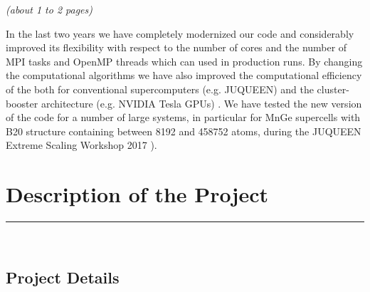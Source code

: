 \documentclass [a4paper, 12pt]{article}
\begin{document}
\textit{(about 1 to 2 pages)}


In the last two years we have completely modernized our code and considerably improved 
its flexibility with respect to the number of cores and the number of MPI tasks and
OpenMP threads which can used in production runs. By changing the computational algorithms
we have also improved the computational efficiency of the both for conventional
supercomputers (e.g. JUQUEEN) and the cluster-booster architecture
(e.g. NVIDIA Tesla GPUs) \cite{dutot_addressing_2016}. 
We have tested the new version of the code for a number of large systems, 
in particular for MnGe supercells with B20 structure containing between 8192 and 458752 atoms,
during the JUQUEEN Extreme Scaling Workshop 2017 \cite{brommel_juqueen_2017}).

\section{Description of the Project}
\rule{\textwidth}{0.4pt}\\
\subsection{Project Details}

\end{document}
